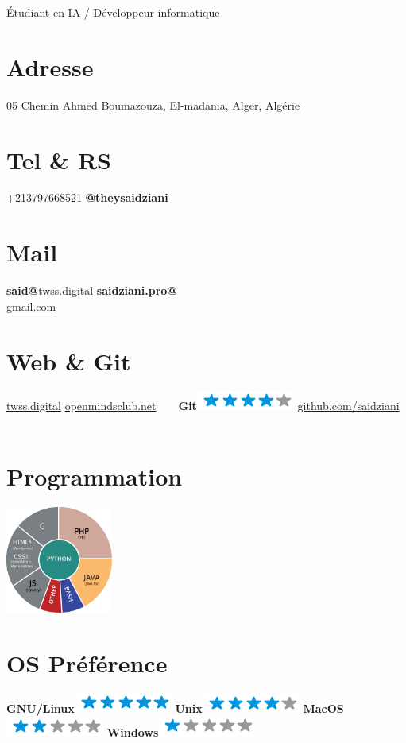 \documentclass[]{friggeri-cv}
\begin{document}
      {Étudiant en IA / Développeur informatique}
      

\begin{aside}
  \section{Adresse}
    05 Chemin Ahmed Boumazouza,
    El-madania, Alger, Algérie
    ~
    ~
  \section{Tel \& RS}
    +213797668521
    {\textbf{@theysaidziani}}
    ~
    ~
  \section{Mail}
    \href{mailto:said@twss.digital}{\textbf{said@}twss.digital}
    \href{mailto:saidziani.pro@gmail.com}{\textbf{saidziani.pro@\\}gmail.com}
    ~
    ~
  \section{Web \& Git}
    \href{http://www.twss.digital}{twss.digital}
    \href{http://www.openmindsclub.net}{openmindsclub.net}
    ~
    ~
    \textbf{Git}\includegraphics[scale=0.40]{img/4stars.png}
    \href{https://github.com/saidziani}{github.com/saidziani}
    ~
    ~
  \section{Programmation}
    \includegraphics[width=100pt]{img/programmation.jpg}
    ~
    ~
  \section{OS Préférence}
    \textbf{GNU/Linux}\includegraphics[scale=0.40]{img/5stars.png}
    \textbf{Unix}\includegraphics[scale=0.40]{img/4stars.png}
    \textbf{MacOS}\includegraphics[scale=0.40]{img/2stars.png}
    \textbf{Windows}\includegraphics[scale=0.40]{img/1stars.png}
    ~
    ~

\end{aside}
\end{document}
